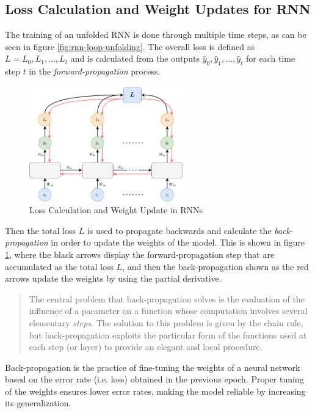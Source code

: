         \subsection{Loss Calculation and Weight Updates for RNN}
        \label{sec:loss-calculation-and-weight-updates-for-rnn-background}
        
            The training of an unfolded RNN is done through multiple time steps, as can be seen in figure \ref{fig:rnn-loop-unfolding}.
            The overall loss is defined as $L = L_0, L_1, \dots, L_t$ and is calculated from the outputs $\hat{y}_0, \hat{y}_1, \dots, \hat{y}_t$  for each time step $t$ in the \emph{forward-propagation} process.
            \begin{figure}[h!]
                \centering
                \includegraphics[width=0.6\textwidth]{figures/rnn_loss_calculation.drawio.png}
                \caption{Loss Calculation and Weight Update in RNNs}
                \label{fig:loss-calculation-weight-update-rnn}
            \end{figure}
            Then the total loss $L$ is used to propagate backwards and calculate the \emph{back-propagation} in order to update the weights of the model.
            This is shown in figure \ref{fig:loss-calculation-weight-update-rnn}, where the black arrows display the forward-propagation step that are accumulated as the total loss $L$, and then the back-propagation shown as the red arrows update the weights by using the partial derivative.

            \begin{quote}
                The central problem that back-propagation solves is the evaluation of the influence of a parameter on a function whose computation involves several elementary \emph{steps}. The solution to this problem is given by the chain rule, but back-propagation exploits the particular form of the functions used at each step (or layer) to provide an elegant and local procedure. \cite{lecunTheoreticalFrameworkBackpropagation1988}
            \end{quote}
            Back-propagation is the practice of fine-tuning the weights of a neural network based on the error rate (i.e. loss) obtained in the previous epoch. Proper tuning of the weights ensures lower error rates, making the model reliable by increasing its generalization.


